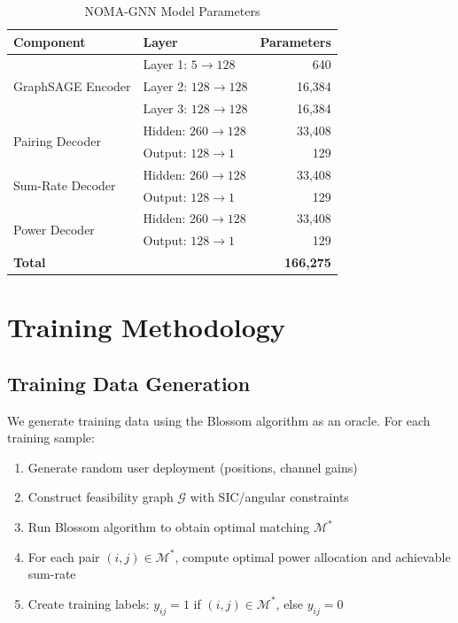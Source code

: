 \begin{table}[ht]
\centering
\caption{NOMA-GNN Model Parameters}
\label{tab:model_params}
\begin{tabular}{|l|l|r|}
\hline
\textbf{Component} & \textbf{Layer} & \textbf{Parameters} \\
\hline
\multirow{3}{*}{GraphSAGE Encoder} & Layer 1: $5 \rightarrow 128$ & 640 \\
& Layer 2: $128 \rightarrow 128$ & 16,384 \\
& Layer 3: $128 \rightarrow 128$ & 16,384 \\
\hline
\multirow{2}{*}{Pairing Decoder} & Hidden: $260 \rightarrow 128$ & 33,408 \\
& Output: $128 \rightarrow 1$ & 129 \\
\hline
\multirow{2}{*}{Sum-Rate Decoder} & Hidden: $260 \rightarrow 128$ & 33,408 \\
& Output: $128 \rightarrow 1$ & 129 \\
\hline
\multirow{2}{*}{Power Decoder} & Hidden: $260 \rightarrow 128$ & 33,408 \\
& Output: $128 \rightarrow 1$ & 129 \\
\hline
\textbf{Total} & & \textbf{166,275} \\
\hline
\end{tabular}
\end{table}

\section{Training Methodology}

\subsection{Training Data Generation}

We generate training data using the Blossom algorithm as an oracle. For each training sample:

\begin{enumerate}
    \item Generate random user deployment (positions, channel gains)
    \item Construct feasibility graph $\mathcal{G}$ with SIC/angular constraints
    \item Run Blossom algorithm to obtain optimal matching $\mathcal{M}^*$
    \item For each pair $(i,j) \in \mathcal{M}^*$, compute optimal power allocation and achievable sum-rate
    \item Create training labels: $y_{ij} = 1$ if $(i,j) \in \mathcal{M}^*$, else $y_{ij} = 0$
\end{enumerate}

